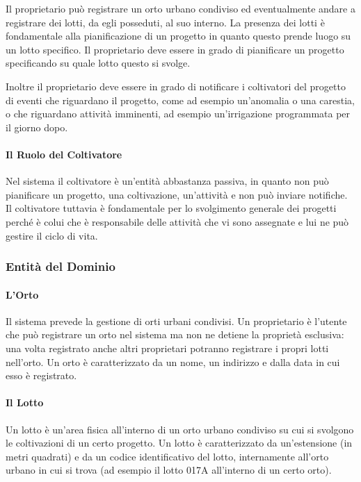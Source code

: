 \documentclass[12pt,a4paper]{article}
\begin{document}
Il proprietario può registrare un orto urbano condiviso ed eventualmente andare a registrare
dei lotti, da egli posseduti, al suo interno. La presenza dei lotti è fondamentale alla
pianificazione di un progetto in quanto questo prende luogo su un lotto specifico. Il
proprietario deve essere in grado di pianificare un progetto specificando su quale lotto
questo si svolge.

Inoltre il proprietario deve essere in grado di notificare i coltivatori del progetto di
eventi che riguardano il progetto, come ad esempio un'anomalia o una carestia, o che
riguardano attività imminenti, ad esempio un'irrigazione programmata per il giorno dopo.

\paragraph{Il Ruolo del Coltivatore}

Nel sistema il coltivatore è un'entità abbastanza passiva, in quanto non può pianificare un
progetto, una coltivazione, un'attività e non può inviare notifiche. Il coltivatore tuttavia
è fondamentale per lo svolgimento generale dei progetti perché è colui che è responsabile
delle attività che vi sono assegnate e lui ne può gestire il ciclo di vita.

\subsubsection{Entità del Dominio}

\paragraph{L'Orto}

Il sistema prevede la gestione di orti urbani condivisi. Un proprietario è l'utente che può
registrare un orto nel sistema ma non ne detiene la proprietà esclusiva: una volta registrato
anche altri proprietari potranno registrare i propri lotti nell'orto. Un orto è caratterizzato
da un nome, un indirizzo e dalla data in cui esso è registrato.

\paragraph{Il Lotto}

Un lotto è un'area fisica all'interno di un orto urbano condiviso su cui si svolgono le
coltivazioni di un certo progetto. Un lotto è caratterizzato da un'estensione (in metri
quadrati) e da un codice identificativo del lotto, internamente all'orto urbano in cui si
trova (ad esempio il lotto 017A all'interno di un certo orto).
\end{document}
